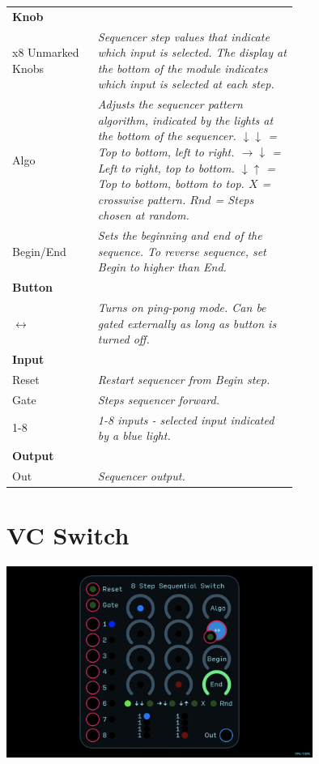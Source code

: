 \documentclass[11pt]{book}
\begin{document}
\begin{table}[ht]
\small
\sffamily
\renewcommand\arraystretch{1.5}
\centering
\begin{tabular}{l*{1}{>{\raggedright\arraybackslash}p{0.7\linewidth}}}

\toprule
\textbf{Knob} \\
x8 Unmarked Knobs & \textit{Sequencer step values that indicate which input is selected. The display at the bottom of the module indicates which input is selected at each step.} \\
Algo & \textit{Adjusts the sequencer pattern algorithm, indicated by the lights at the bottom of the sequencer. $\downarrow \downarrow$ = Top to bottom, left to right. $\rightarrow \downarrow$ = Left to right, top to bottom. $\downarrow \uparrow$ = Top to bottom, bottom to top. $X$ = crosswise pattern. $Rnd$ = Steps chosen at random.} \\
Begin/End & \textit{Sets the beginning and end of the sequence. To reverse sequence, set Begin to higher than End.} \\

\midrule
\textbf{Button} \\
$\leftrightarrow$ & \textit{Turns on ping-pong mode. Can be gated externally as long as button is turned off.} \\

\midrule
\textbf{Input} \\
Reset & \textit{Restart sequencer from Begin step.} \\
Gate & \textit{Steps sequencer forward.} \\
1-8 & \textit{1-8 inputs - selected input indicated by a blue light.} \\

\midrule
\textbf{Output} \\
Out & \textit{Sequencer output.} \\

\bottomrule
\end{tabular}
\end{table}

\pagebreak


\section{VC Switch}

\begin{center}
\includegraphics[width=0.75\textwidth]{8-step-sequential-switch.png}
\end{center}
\end{document}

